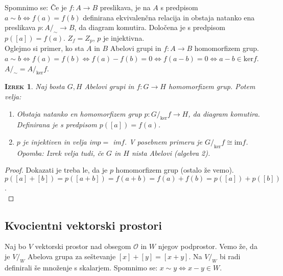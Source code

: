 \documentclass[a4paper,12pt]{article}
\newtheorem*{izrek}{\textsc{Izrek}}
\begin{document}
Spomnimo se: Če je $f:A\to B$ preslikava, je na $A$ s predpisom $a\sim b \Leftrightarrow f(a)=f(b)$ definirana ekvivalenčna relacija in obstaja natanko ena preslikava $p: A/_\sim \to B$, da diagram \Smiley{} komutira. Določena je s predpisom $p([a])=f(a)$. $Z_f=Z_p$, $p$ je injektivna. \\

Oglejmo si primer, ko sta $A$ in $B$ Abelovi grupi in $f:A\to B$ homomorfizem grup. \\

$a\sim b \Leftrightarrow f(a)=f(b) \Leftrightarrow f(a)-f(b) = 0  \Leftrightarrow f(a-b)=0 \Leftrightarrow a-b\in \text{ker}f$. \\

$A/_\sim = A/_\text{ker}f$. \\

\begin{izrek}
Naj bosta $G,H$ Abelovi grupi in $f:G\to H$ homomorfizem grup. Potem velja:
\begin{enumerate}
\item Obstaja natanko en homomorfizem grup $p:G/_\text{ker}f \to H$, da diagram \Smiley{} komutira. Definirana je s predpisom $p([a])=f(a)$. 
\item $p$ je injektiven in velja \emph{im}$p = $ \emph{im}$f$. V posebnem primeru je $G/_\text{ker}f \cong \text{im}f$. \\

Opomba: Izrek velja tudi, če $G$ in $H$ nista Abelovi (algebra 2).\\ 
\end{enumerate}
\end{izrek}

\begin{proof}
Dokazati je treba le, da je $p$ homomorfizem grup (ostalo že vemo). \\

$p([a]+[b])=p([a+b])=f(a+b)=f(a)+f(b)=p([a])+p([b])$. \\
\end{proof}

\newpage

\subsection{Kvocientni vektorski prostori}

Naj bo $V$ vektorski prostor nad obsegom $\mathcal{O}$ in $W$ njegov podprostor. Vemo že, da je $V/_W$ Abelova grupa za seštevanje $[x]+[y]=[x+y]$. Na $V/_W$ bi radi definirali še množenje s skalarjem. Spomnimo se: $x\sim y \Leftrightarrow x-y\in W$.\\
\end{document}
